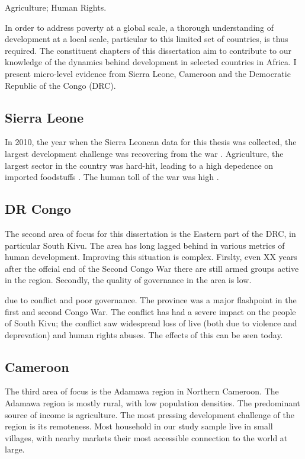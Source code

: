 Agriculture; Human Rights.

In order to address poverty at a global scale, a thorough understanding of development at a local scale, particular to this limited set of countries, is thus required. The constituent chapters of this dissertation aim to contribute to our knowledge of the dynamics behind development in selected countries in Africa. I present micro-level evidence from Sierra Leone, Cameroon and the Democratic Republic of the Congo (DRC). %

\subsection{Sierra Leone}
In 2010, the year when the Sierra Leonean data for this thesis was collected, the largest development challenge was recovering from the war . Agriculture, the largest sector in the country was hard-hit, leading to a high depedence on imported foodstuffs \citep{FAO2005}. The human toll of the war was high .


\subsection{DR Congo}
The second area of focus for this dissertation is the Eastern part of the DRC, in particular South Kivu. The area has long lagged behind in various metrics of human development.  Improving this situation is complex. Firslty, even XX years after the offcial end of the Second Congo War there are still armed groups active in the region.  Secondly, the quality of governance in the area is low.  


due to conflict and poor governance. The province was a major flashpoint in the first and second Congo War. The conflict has had a severe impact on the people of South Kivu; the conflict saw widespread loss of live (both due to violence and deprevation) and human rights abuses. The effects of this can be seen today. 

\subsection{Cameroon}
The third area of focus is the Adamawa region in Northern Cameroon. The Adamawa region is mostly rural, with low population densities. The predominant source of income is agriculture. The most pressing development challenge of the region is its remoteness. Most household in our study sample live in small villages, with nearby markets their most accessible connection to the world at large. 

